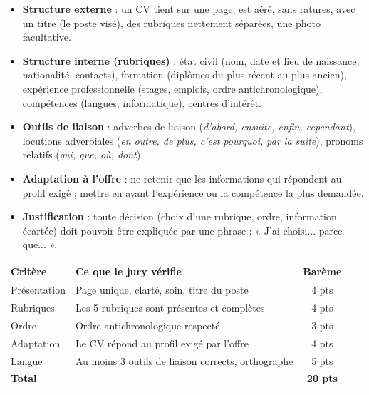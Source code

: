 \documentclass[11pt]{article}
\newcommand{\cle}[1]{{\popxbold\color{popdark}#1}}
\begin{document}
\begin{aretenir}
\begin{itemize}
\item \textbf{Structure externe} : un CV tient sur \cle{une page}, est aéré, sans ratures, avec un titre (le poste visé), des rubriques nettement séparées, une photo facultative.
\item \textbf{Structure interne (rubriques)} : \cle{état civil} (nom, date et lieu de naissance, nationalité, contacts), \cle{formation} (diplômes du plus récent au plus ancien), \cle{expérience professionnelle} (stages, emplois, ordre antichronologique), \cle{compétences} (langues, informatique), \cle{centres d'intérêt}.
\item \textbf{Outils de liaison} : adverbes de liaison (\emph{d'abord, ensuite, enfin, cependant}), locutions adverbiales (\emph{en outre, de plus, c'est pourquoi, par la suite}), pronoms relatifs (\emph{qui, que, où, dont}).
\item \textbf{Adaptation à l'offre} : ne retenir que les informations qui répondent au profil exigé ; mettre en avant l'expérience ou la compétence la plus demandée.
\item \textbf{Justification} : toute décision (choix d'une rubrique, ordre, information écartée) doit pouvoir être expliquée par une phrase : « J'ai choisi... parce que... ».
\end{itemize}
\end{aretenir}

\begin{center}
\begin{tabularx}{\linewidth}{|l|X|c|}
\hline
\rowcolor{popblueL} \textbf{Critère} & \textbf{Ce que le jury vérifie} & \textbf{Barème} \\
\hline
Présentation & Page unique, clarté, soin, titre du poste & 4 pts \\
\hline
Rubriques & Les 5 rubriques sont présentes et complètes & 4 pts \\
\hline
Ordre & Ordre antichronologique respecté & 3 pts \\
\hline
Adaptation & Le CV répond au profil exigé par l'offre & 4 pts \\
\hline
Langue & Au moins 3 outils de liaison corrects, orthographe & 5 pts \\
\hline
\textbf{Total} & & \textbf{20 pts} \\
\hline
\end{tabularx}
\end{center}
\end{document}
